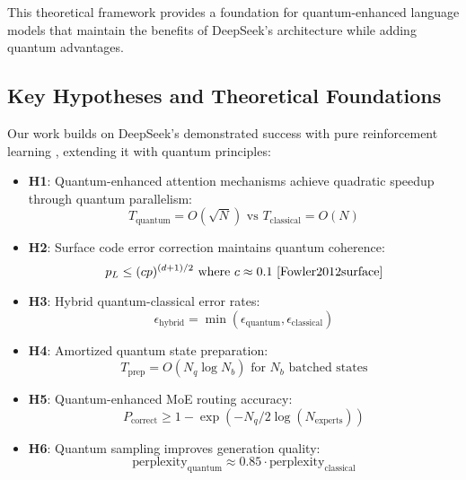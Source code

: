 \documentclass{article}
\begin{document}
This theoretical framework provides a foundation for quantum-enhanced language models that maintain the benefits of DeepSeek's architecture while adding quantum advantages.

\subsection{Key Hypotheses and Theoretical Foundations}
Our work builds on DeepSeek's demonstrated success with pure reinforcement learning \cite{DeepSeek2024}, extending it with quantum principles:

\begin{itemize}
\item \textbf{H1}: Quantum-enhanced attention mechanisms achieve quadratic speedup through quantum parallelism:
\begin{equation}
T_{\text{quantum}} = O(\sqrt{N}) \text{ vs } T_{\text{classical}} = O(N)
\end{equation}

\item \textbf{H2}: Surface code error correction maintains quantum coherence:
\begin{equation}
p_L \leq (cp)^{(d+1)/2} \text{ where } c \approx 0.1 \text{ \cite{Fowler2012surface}}
\end{equation}

\item \textbf{H3}: Hybrid quantum-classical error rates:
\begin{equation}
\epsilon_{\text{hybrid}} = \min(\epsilon_{\text{quantum}}, \epsilon_{\text{classical}})
\end{equation}

\item \textbf{H4}: Amortized quantum state preparation:
\begin{equation}
T_{\text{prep}} = O(N_q \log N_b) \text{ for } N_b \text{ batched states}
\end{equation}

\item \textbf{H5}: Quantum-enhanced MoE routing accuracy:
\begin{equation}
P_{\text{correct}} \geq 1 - \exp(-N_q/2\log(N_{\text{experts}}))
\end{equation}

\item \textbf{H6}: Quantum sampling improves generation quality:
\begin{equation}
\text{perplexity}_{\text{quantum}} \approx 0.85 \cdot \text{perplexity}_{\text{classical}}
\end{equation}
\end{itemize}
\end{document}
